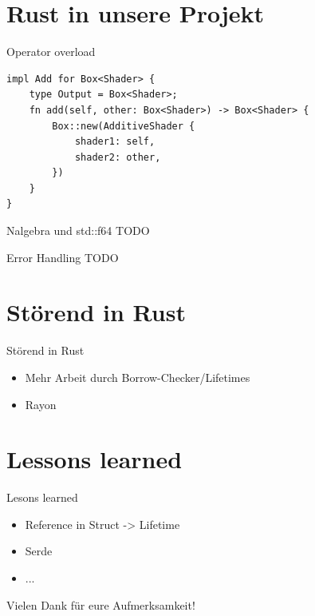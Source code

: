 \documentclass{beamer}
\begin{document}
\section{Rust in unsere Projekt}
\begin{frame}[fragile]{Operator overload}
    \begin{lstlisting}
impl Add for Box<Shader> {
    type Output = Box<Shader>;
    fn add(self, other: Box<Shader>) -> Box<Shader> {
        Box::new(AdditiveShader {
            shader1: self,
            shader2: other,
        })
    }
}
    \end{lstlisting}
\end{frame}
\begin{frame}{Nalgebra und std::f64}
    TODO
\end{frame}
\begin{frame}{Error Handling}
    TODO
\end{frame}
\section{Störend in Rust}
\begin{frame}{Störend in Rust}
    \begin{itemize}[<+->]
        \item Mehr Arbeit durch Borrow-Checker/Lifetimes
        \item Rayon 
    \end{itemize}
\end{frame}
\section{Lessons learned}
\begin{frame}{Lesons learned}
    \begin{itemize}[<+->]
        \item Reference in Struct -> Lifetime
        \item Serde
        \item ...
    \end{itemize}
\end{frame}

\begin{frame}[standout]
\centering
\Huge Vielen Dank für eure Aufmerksamkeit!

\end{frame}
\end{document}
